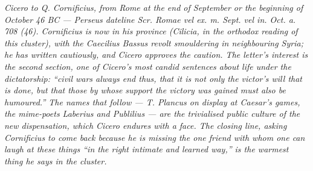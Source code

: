 
\textit{Cicero to Q. Cornificius, from Rome at the end of September or the
beginning of October 46 BC --- Perseus dateline \textit{Scr. Romae vel ex. m.
Sept. vel in. Oct. a. 708 (46)}. Cornificius is now in his province
(Cilicia, in the orthodox reading of this cluster), with the Caecilius
Bassus revolt smouldering in neighbouring Syria; he has written cautiously,
and Cicero approves the caution. The letter's interest is the second
section, one of Cicero's most candid sentences about life under the
dictatorship: ``civil wars always end thus, that it is not only the
victor's will that is done, but that those by whose support the victory
was gained must also be humoured.'' The names that follow --- T. Plancus
on display at Caesar's games, the mime-poets Laberius and Publilius ---
are the trivialised public culture of the new dispensation, which Cicero
endures with a face. The closing line, asking Cornificius to come back
because he is missing the one friend with whom one can laugh at these
things ``in the right intimate and learned way,'' is the warmest thing
he says in the cluster.}

